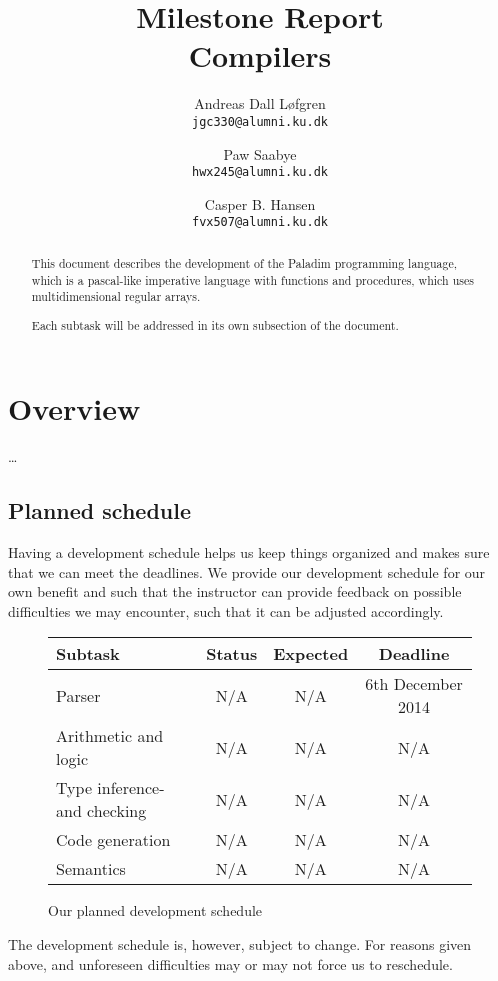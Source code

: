 \documentclass[11pt]{article}
\title%
{%
	{\large Milestone Report}\\
	Compilers
}
\author%
{%
	Andreas Dall Løfgren\\
	{\tt jgc330@alumni.ku.dk}
	\and
	Paw Saabye\\
	{\tt hwx245@alumni.ku.dk}
	\and
	Casper B. Hansen\\
	{\tt fvx507@alumni.ku.dk}
}
\begin{document}
\clearpage
\maketitle
\thispagestyle{empty}
\begin{multicols}{2}
\begin{abstract}
This document describes the development of the Paladim programming language,
which is a pascal-like imperative language with functions and procedures, which
uses multidimensional regular arrays.

Each subtask will be addressed in its own subsection of the document.
\end{abstract}
\vfill
\columnbreak%
\tableofcontents
\end{multicols}

\clearpage
\section{Overview}
\ldots

\subsection{Planned schedule}
Having a development schedule helps us keep things organized and makes sure
that we can meet the deadlines. We provide our development schedule for our
own benefit and such that the instructor can provide feedback on possible
difficulties we may encounter, such that it can be  adjusted accordingly.
\begin{figure}[H]
	\centering
	\begin{tabular}{|l|c|c|c|}
		\hline
		{\bf Subtask} & {\bf Status} & {\bf Expected} & {\bf Deadline} \\ \hline
		Parser & N/A & N/A & 6th December 2014 \\ \hline
		Arithmetic and logic & N/A & N/A & N/A \\ \hline
		Type inference- and checking & N/A & N/A & N/A \\ \hline
		Code generation & N/A & N/A & N/A \\ \hline
		Semantics & N/A & N/A & N/A \\ \hline
	\end{tabular}
	\label{table:schedule}
	\caption{Our planned development schedule}
\end{figure}
The development schedule is, however, subject to change. For reasons given
above, and unforeseen difficulties may or may not force us to reschedule.
\end{document}
